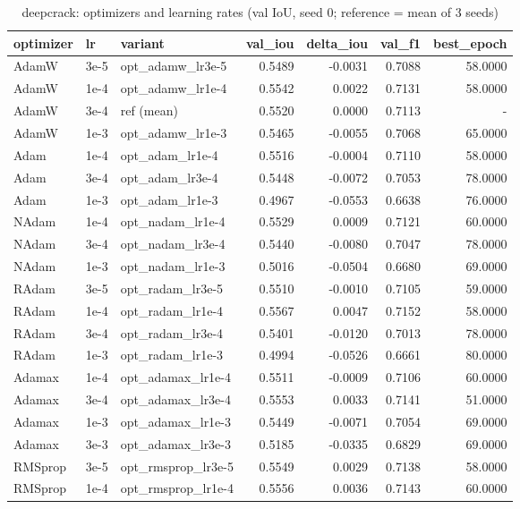 \begin{table}
\caption{deepcrack: optimizers and learning rates (val IoU, seed 0; reference = mean of 3 seeds)}
\label{tab:ablation_deepcrack_optimizer}
\begin{tabular}{lllrrrr}
\toprule
optimizer & lr & variant & val\_iou & delta\_iou & val\_f1 & best\_epoch \\
\midrule
AdamW & 3e-5 & opt\_adamw\_lr3e-5 & 0.5489 & -0.0031 & 0.7088 & 58.0000 \\
AdamW & 1e-4 & opt\_adamw\_lr1e-4 & 0.5542 & 0.0022 & 0.7131 & 58.0000 \\
AdamW & 3e-4 & ref (mean) & 0.5520 & 0.0000 & 0.7113 & - \\
AdamW & 1e-3 & opt\_adamw\_lr1e-3 & 0.5465 & -0.0055 & 0.7068 & 65.0000 \\
Adam & 1e-4 & opt\_adam\_lr1e-4 & 0.5516 & -0.0004 & 0.7110 & 58.0000 \\
Adam & 3e-4 & opt\_adam\_lr3e-4 & 0.5448 & -0.0072 & 0.7053 & 78.0000 \\
Adam & 1e-3 & opt\_adam\_lr1e-3 & 0.4967 & -0.0553 & 0.6638 & 76.0000 \\
NAdam & 1e-4 & opt\_nadam\_lr1e-4 & 0.5529 & 0.0009 & 0.7121 & 60.0000 \\
NAdam & 3e-4 & opt\_nadam\_lr3e-4 & 0.5440 & -0.0080 & 0.7047 & 78.0000 \\
NAdam & 1e-3 & opt\_nadam\_lr1e-3 & 0.5016 & -0.0504 & 0.6680 & 69.0000 \\
RAdam & 3e-5 & opt\_radam\_lr3e-5 & 0.5510 & -0.0010 & 0.7105 & 59.0000 \\
RAdam & 1e-4 & opt\_radam\_lr1e-4 & 0.5567 & 0.0047 & 0.7152 & 58.0000 \\
RAdam & 3e-4 & opt\_radam\_lr3e-4 & 0.5401 & -0.0120 & 0.7013 & 78.0000 \\
RAdam & 1e-3 & opt\_radam\_lr1e-3 & 0.4994 & -0.0526 & 0.6661 & 80.0000 \\
Adamax & 1e-4 & opt\_adamax\_lr1e-4 & 0.5511 & -0.0009 & 0.7106 & 60.0000 \\
Adamax & 3e-4 & opt\_adamax\_lr3e-4 & 0.5553 & 0.0033 & 0.7141 & 51.0000 \\
Adamax & 1e-3 & opt\_adamax\_lr1e-3 & 0.5449 & -0.0071 & 0.7054 & 69.0000 \\
Adamax & 3e-3 & opt\_adamax\_lr3e-3 & 0.5185 & -0.0335 & 0.6829 & 69.0000 \\
RMSprop & 3e-5 & opt\_rmsprop\_lr3e-5 & 0.5549 & 0.0029 & 0.7138 & 58.0000 \\
RMSprop & 1e-4 & opt\_rmsprop\_lr1e-4 & 0.5556 & 0.0036 & 0.7143 & 60.0000 \\

\end{tabular}
\end{table}
